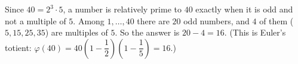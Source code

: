 Since $40=2^3\cdot5$, a number is relatively prime to $40$ exactly when it is odd and not a multiple of $5$. Among $1,\dots,40$ there are $20$ odd numbers, and $4$ of them ($5,15,25,35$) are multiples of $5$. So the answer is $20-4=\boxed{16}$. (This is Euler's totient: $\varphi(40)=40\left(1-\dfrac{1}{2}\right)\left(1-\dfrac{1}{5}\right)=16$.)
